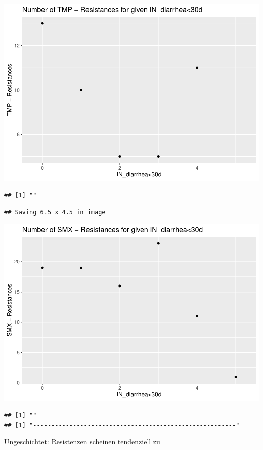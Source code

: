 \documentclass[
]{article}
\begin{document}
\includegraphics{NResistenzen_files/figure-latex/numerical_variables-39.pdf}

\begin{verbatim}
## [1] ""
\end{verbatim}

\begin{verbatim}
## Saving 6.5 x 4.5 in image
\end{verbatim}

\includegraphics{NResistenzen_files/figure-latex/numerical_variables-40.pdf}

\begin{verbatim}
## [1] ""
## [1] "--------------------------------------------------------"
\end{verbatim}

Ungeschichtet: Resistenzen scheinen tendenziell zu
\end{document}
